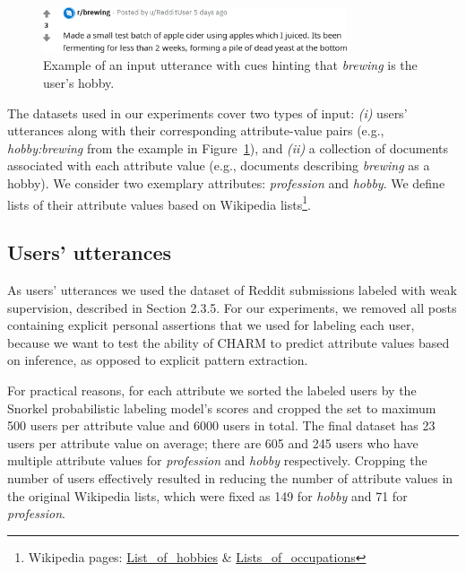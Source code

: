 
\vspace{-5pt}
\begin{figure}[th!]
\centering
\includegraphics[width=0.8\textwidth]{imgs/brew.png}
\caption{
Example of an input utterance with cues hinting that \emph{brewing} is the user's hobby.
}
\label{fig:input}
\end{figure}

\vspace{-5pt}
The datasets used in our experiments cover two types of input: \emph{(i)} users' utterances along with their corresponding attribute-value pairs (e.g., \emph{hobby:brewing} from the example in Figure~\ref{fig:input}),
and 
\emph{(ii)} a collection of documents associated with each attribute value
(e.g., documents describing \emph{brewing} as a hobby).
We consider two exemplary attributes: \emph{profession} and \emph{hobby}.
We define lists of their attribute values based on Wikipedia lists\footnote{Wikipedia pages: \href{https://en.wikipedia.org/wiki/List_of_hobbies}{{List\_of\_hobbies}} \& \href{https://en.wikipedia.org/wiki/Lists_of_occupations}{{Lists\_of\_occupations}}}.

\vspace{-5pt}
\subsection{Users' utterances}

As users' utterances we used the dataset of Reddit submissions labeled with weak supervision, described in Section 2.3.5.
For our experiments,
we removed all posts containing explicit personal assertions that we used for labeling each user, because we want to test the ability of CHARM to predict attribute values based on inference, as opposed to explicit pattern extraction. 

For practical reasons, for each attribute
we sorted the labeled users by the Snorkel probabilistic labeling model's scores and cropped the set to maximum 500 users per attribute value and 6000 users in total. 
The final dataset has 23 users per attribute value on average; there are 605 and 245 users who have multiple attribute values for \textit{profession} and \textit{hobby} respectively. Cropping the number of users effectively resulted in reducing the number of attribute values in the original Wikipedia lists, which were fixed as 149 for {\em hobby} and 71 for {\em profession}. 

